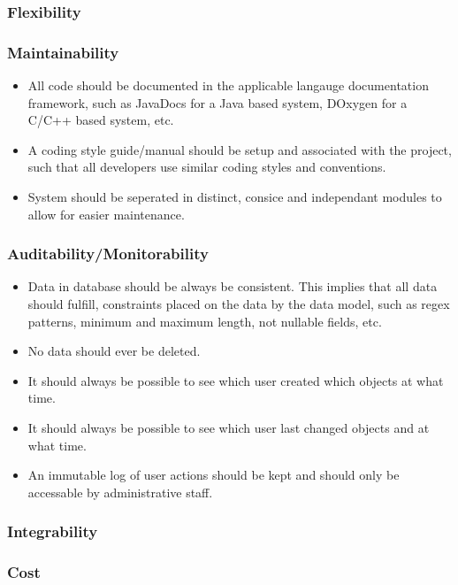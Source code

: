 \documentclass[a4paper,10pt]{article}
\begin{document}
\subsubsection{Flexibility}

\subsubsection{Maintainability}
\begin{itemize}
\item All code should be documented in the applicable langauge documentation framework, such as JavaDocs for a Java based system, DOxygen for a C/C++ based system, etc.
\item A coding style guide/manual should be setup and associated with the project, such that all developers use similar coding styles and conventions.
\item System should be seperated in distinct, consice and independant modules to allow for easier maintenance.
\end{itemize}

\subsubsection{Auditability/Monitorability}
\begin{itemize}
\item Data in database should be always be consistent. This implies that all data should fulfill, constraints placed on the data by the data model, such as regex patterns, minimum and maximum length, not nullable fields, etc.
\item No data should ever be deleted.
\item It should always be possible to see which user created which objects at what time.
\item It should always be possible to see which user last changed objects and at what time.
\item An immutable log of user actions should be kept and should only be accessable by administrative staff.
\end{itemize}

\subsubsection{Integrability}

\subsubsection{Cost}
\end{document}
